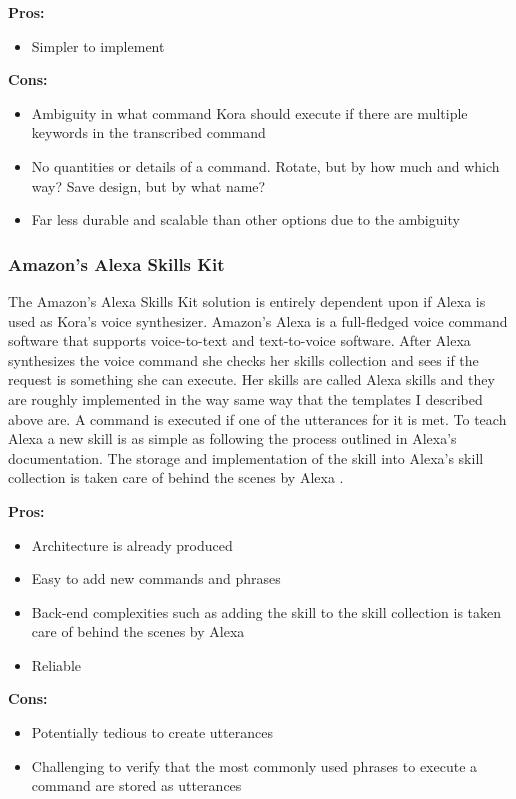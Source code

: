 \documentclass[onecolumn, draftclsnofoot,10pt, compsoc]{IEEEtran}
\begin{document}
	\textbf{Pros:}
	\begin{itemize}
		\item{
			Simpler to implement}
	\end{itemize}

	\textbf{Cons:}
	\begin{itemize}
		\item{
			Ambiguity in what command Kora should execute if there are multiple keywords in the transcribed command}
		\item{
			No quantities or details of a command. Rotate, but by how much and which way? Save design, but by what name? }
		\item{
			Far less durable and scalable than other options due to the ambiguity}
	\end{itemize}


	\subsubsection{Amazon's Alexa Skills Kit}
	The Amazon's Alexa Skills Kit solution is entirely dependent upon if Alexa is used as Kora's voice synthesizer.
	Amazon's Alexa is a full-fledged voice command software that supports voice-to-text and text-to-voice software.
	After Alexa synthesizes the voice command she checks her skills collection and sees if the request is something she can execute.
	Her skills are called Alexa skills and they are roughly implemented in the way same way that the templates I described above are.
	A command is executed if one of the utterances for it is met.
	To teach Alexa a new skill is as simple as following the process outlined in Alexa's documentation.
	The storage and implementation of the skill into Alexa's skill collection is taken care of behind the scenes by Alexa \cite{alexaSkills}.

	\textbf{Pros:}
	\begin{itemize}
		\item{
			Architecture is already produced}
		\item{
			Easy to add new commands and phrases}
		\item{
			Back-end complexities such as adding the skill to the skill collection is taken care of behind the scenes by Alexa}
		\item{
			Reliable}
	\end{itemize}

	\textbf{Cons:}
	\begin{itemize}
		\item{
			Potentially tedious to create utterances}
		\item{
			Challenging to verify that the most commonly used phrases to execute a command are stored as utterances}
	\end{itemize}
\end{document}
